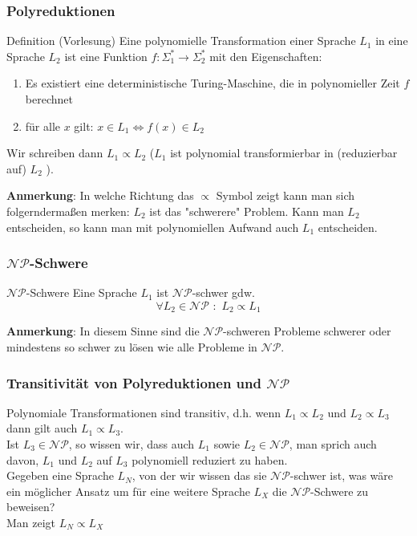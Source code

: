 \documentclass{beamer}
\begin{document}
\begin{frame}
\frametitle{Polyreduktionen}
\begin{block}{Definition (Vorlesung)}
Eine polynomielle Transformation einer Sprache $L_1$ in eine Sprache $L_2$ ist eine Funktion
$f: \Sigma^*_1 \rightarrow \Sigma^*_2$ mit den Eigenschaften:
\begin{enumerate}
\item Es existiert eine deterministische Turing-Maschine, die in polynomieller Zeit $f$ berechnet
\item für alle $x$ gilt: $x \in L_1 \iff f(x) \in  L_2$
\end{enumerate}
Wir schreiben dann $L_1 \propto L_2$ ($L_1$ ist polynomial transformierbar in (reduzierbar auf) $L_2$ ).
\end{block}
\textbf{Anmerkung}: In welche Richtung das $\propto$ Symbol zeigt kann man sich folgerndermaßen  merken:
$L_2$ ist das "schwerere" Problem. Kann man $L_2$ entscheiden, so kann man mit polynomiellen Aufwand auch $L_1$ entscheiden.
\end{frame}


\begin{frame}
\frametitle{$\mathcal{NP}$-Schwere}
\begin{block}{$\mathcal{NP}$-Schwere}
Eine Sprache $L_1$ ist $\mathcal{NP}$-schwer gdw. 
\[\forall L_2 \in \mathcal{NP} \,\, : \,\, L_2 \propto L_1\]
\end{block}
\textbf{Anmerkung}: In diesem Sinne sind die $\mathcal{NP}$-schweren Probleme schwerer oder mindestens so schwer zu lösen wie alle Probleme in $\mathcal{NP}$.
\end{frame}

\begin{frame}
\frametitle{Transitivität von Polyreduktionen und $\mathcal{NP}$}
Polynomiale Transformationen sind transitiv, d.h. wenn $L_1 \propto L_2$ und $L_2 \propto L_3$ dann gilt auch $L_1 \propto L_3$.\\[8pt]
Ist $L_3 \in \mathcal{NP}$, so wissen wir, dass auch $L_1$ sowie $L_2 \in \mathcal{NP}$, man sprich auch davon, $L_1$ und $L_2$ auf $L_3$ polynomiell reduziert zu haben.\\[8pt]
Gegeben eine Sprache $L_N$, von der wir wissen das sie $\mathcal{NP}$-schwer ist, was wäre ein möglicher Ansatz um für eine weitere Sprache $L_X$ die $\mathcal{NP}$-Schwere zu beweisen?\\
\pause
Man zeigt $L_N \propto L_X$
\end{frame}
\end{document}
